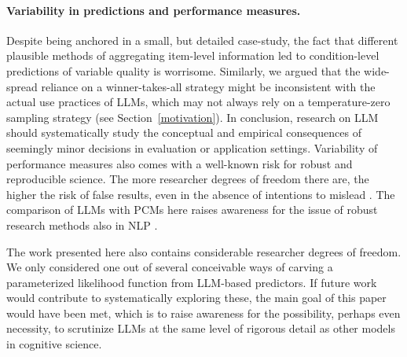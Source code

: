 \documentclass[fleqn]{article}
\begin{document}


\paragraph{Variability in predictions and performance measures.}
Despite being anchored in a small, but detailed case-study, the fact that different plausible methods of aggregating item-level information led to condition-level predictions of variable quality is worrisome.
Similarly, we argued that the wide-spread reliance on a winner-takes-all strategy might be inconsistent with the actual use practices of LLMs, which may not always rely on a temperature-zero sampling strategy (see Section~\ref{motivation}).
In conclusion, research on LLM should systematically study the conceptual and empirical consequences of seemingly minor decisions in evaluation or application settings.
Variability of performance measures also comes with a well-known risk for robust and reproducible science.
The more researcher degrees of freedom there are, the higher the risk of false results, even in the absence of intentions to mislead \citep[e.g.][]{Ioannidis2005:Why-Most-Publis,Chambers2017:The-Seven-Deadl}.
The comparison of LLMs with PCMs here raises awareness for the issue of robust research methods also in NLP \citep{WielingRawee2018:Reproducibility}.

The work presented here also contains considerable researcher degrees of freedom.
We only considered one out of several conceivable ways of carving a parameterized likelihood function from LLM-based predictors.
If future work would contribute to systematically exploring these, the main goal of this paper would have been met, which is to raise awareness for the possibility, perhaps even necessity, to scrutinize LLMs at the same level of rigorous detail as other models in cognitive science.
\end{document}
